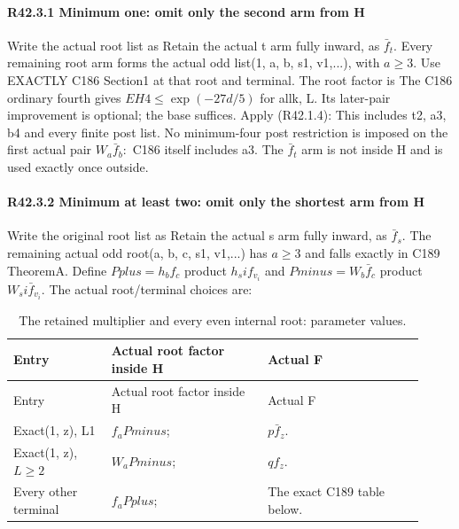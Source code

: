 \paragraph{R42.3.1 Minimum one: omit only the second arm from H}

Write the actual root list as
Retain the actual t arm fully inward, as \(\bar f_t.\) Every remaining root arm
forms the actual odd list(1, a, b, s1, v1,...), with \(a\ge 3.\) Use EXACTLY C186
Section1 at that root and terminal. The root factor is
The C186 ordinary fourth gives \(EH4\le \exp(-27d/5)\) for allk, L.
Its later-pair improvement is optional; the base suffices. Apply (R42.1.4):
This includes t2, a3, b4 and every finite post list. No minimum-four post
restriction is imposed on the first actual pair \(W_a \bar f_b:\) C186 itself
includes a3. The \(\bar f_t\) arm is not inside H and is used exactly once outside.

\paragraph{R42.3.2 Minimum at least two: omit only the shortest arm from H}

Write the original root list as
Retain the actual s arm fully inward, as \(\bar f_s.\) The remaining actual
odd root(a, b, c, s1, v1,...) has \(a\ge 3\) and falls exactly in C189 TheoremA.
Define \(Pplus=h_b f_c\) product \(h_si f_{v_i}\) and
\(Pminus=W_b \bar f_c\) product \(W_si \bar f_{v_i}.\) The actual root/terminal choices are:


\begingroup\small
\setlength{\tabcolsep}{3pt}
\setlength{\LTleft}{0pt}\setlength{\LTright}{\fill}
\begin{longtable}{@{}p{0.2200\linewidth}p{0.3500\linewidth}p{0.3500\linewidth}@{}}
\caption{The retained multiplier and every even internal root: parameter values.}\label{tab:parameters:r2-c042:1}\\
\toprule
Entry & Actual root factor inside H & Actual F \\
\midrule\endfirsthead
\toprule
Entry & Actual root factor inside H & Actual F \\
\midrule\endhead
\bottomrule\endfoot
Exact(1, z), L1 & \(f_a Pminus\); & \(p\bar f_z\). \\
\addlinespace[2pt]
Exact(1, z), \(L\ge 2\) & \(W_a Pminus\); & \(q f_z\). \\
\addlinespace[2pt]
Every other terminal & \(f_a Pplus\); & The exact C189 table below. \\
\end{longtable}
\endgroup



